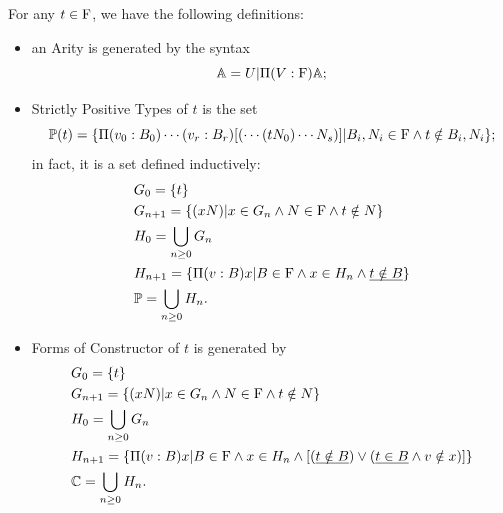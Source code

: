 \begin{definition}
  For any $t \in \mathrm{F}$, we have the following definitions:
  \begin{itemize}
    \item an Arity is generated by the syntax
    \[
      \mathbb{A} = U | \Pi (V: \mathrm{F}) \mathbb{A};
    \]
  \item Strictly Positive Types of $t$ is the set
    \[
      \mathbb{P}(t) = \{ \Pi (v_0 : B_0) \cdots (v_r : B_r) [(\cdots(t N_0) \cdots N_s)] | B_i, N_i \in \mathrm{F} \land t \notin B_i, N_i \};
    \]
  in fact, it is a set defined inductively: 
  \begin{align*}
    & G_0 = \{ t \} \\
    & G_{n+1} = \{ (x N) |x \in G_n \land N \in \mathrm{F} \land t \notin N \}\\
    & H_0 = \bigcup_{n \geq 0} G_n \\
    & H_{n+1} = \{ \Pi (v : B) x | B \in \mathrm{F} \land x \in H_{n} \land \underline{ t \notin B }\}\\
    &\mathbb{P} = \bigcup_{n \geq 0} H_{n}.
  \end{align*}
  \item Forms of Constructor of $t$ is generated by
   \begin{align*}
    & G_0 = \{ t \} \\
    & G_{n+1} = \{ (x N) |x \in G_n \land N \in \mathrm{F} \land t \notin N \}\\
    & H_0 = \bigcup_{n \geq 0} G_n \\
    & H_{n+1} = \{ \Pi (v : B) x | B \in \mathrm{F}  \land x \in H_{n} \land [(\underline{t \notin B}) \lor (\underline{t \in B} \land v \notin x)] \}\\
    &\mathbb{C} = \bigcup_{n \geq 0} H_{n}.
  \end{align*}
  \end{itemize}
\end{definition}







